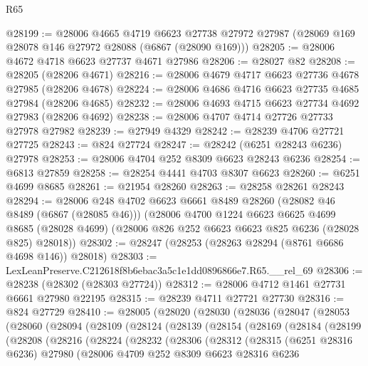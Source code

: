 \begin{lexlean}{R65}
\begin{coremodule}
{@28199 := @28006
    @4665
    @4719
    @6623
    @27738
    @27972
    @27987
    (@28069 @169 @28078 @146 @27972 @28088 (@6867 (@28090 @169)))
@28205 := @28006 @4672 @4718 @6623 @27737 @4671 @27986
@28206 := @28027 @82
@28208 := @28205 (@28206 @4671)
@28216 := @28006 @4679 @4717 @6623 @27736 @4678 @27985 (@28206 @4678)
@28224 := @28006 @4686 @4716 @6623 @27735 @4685 @27984 (@28206 @4685)
@28232 := @28006 @4693 @4715 @6623 @27734 @4692 @27983 (@28206 @4692)
@28238 := @28006 @4707 @4714 @27726 @27733 @27978 @27982
@28239 := @27949 @4329
@28242 := @28239 @4706 @27721 @27725
@28243 := @824 @27724
@28247 := @28242 (@6251 @28243 @6236) @27978
@28253 := @28006 @4704 @252 @8309 @6623 @28243 @6236
@28254 := @6813 @27859
@28258 := @28254 @4441 @4703 @8307 @6623
@28260 := @6251 @4699 @8685
@28261 := @21954 @28260
@28263 := @28258 @28261 @28243
@28294 := @28006
    @248
    @4702
    @6623
    @6661
    @8489
    @28260
    (@28082 @46 @8489 (@6867 (@28085 @46)))
    (@28006
      @4700
      @1224
      @6623
      @6625
      @4699
      @8685
      (@28028 @4699)
      (@28006 @826 @252 @6623 @6623 @825 @6236 (@28028 @825) @28018))
@28302 := @28247 (@28253 (@28263 @28294 (@8761 @6686 @4698 @146)) @28018)
@28303 := LexLeanPreserve.C212618f8b6ebac3a5c1e1dd0896866e7.R65.__rel_69
@28306 := @28238 (@28302 (@28303 @27724))
@28312 := @28006 @4712 @1461 @27731 @6661 @27980 @22195
@28315 := @28239 @4711 @27721 @27730
@28316 := @824 @27729
@28410 := @28005
    (@28020
      (@28030
        (@28036
          (@28047
            (@28053
              (@28060
                (@28094
                  (@28109
                    (@28124
                      (@28139
                        (@28154
                          (@28169
                            (@28184
                              (@28199
                                (@28208
                                  (@28216
                                    (@28224
                                      (@28232
                                        (@28306
                                          (@28312
                                            (@28315
                                              (@6251 @28316 @6236)
                                              @27980
                                              (@28006
                                                @4709
                                                @252
                                                @8309
                                                @6623
                                                @28316
                                                @6236
}
\end{coremodule}
\end{lexlean}
